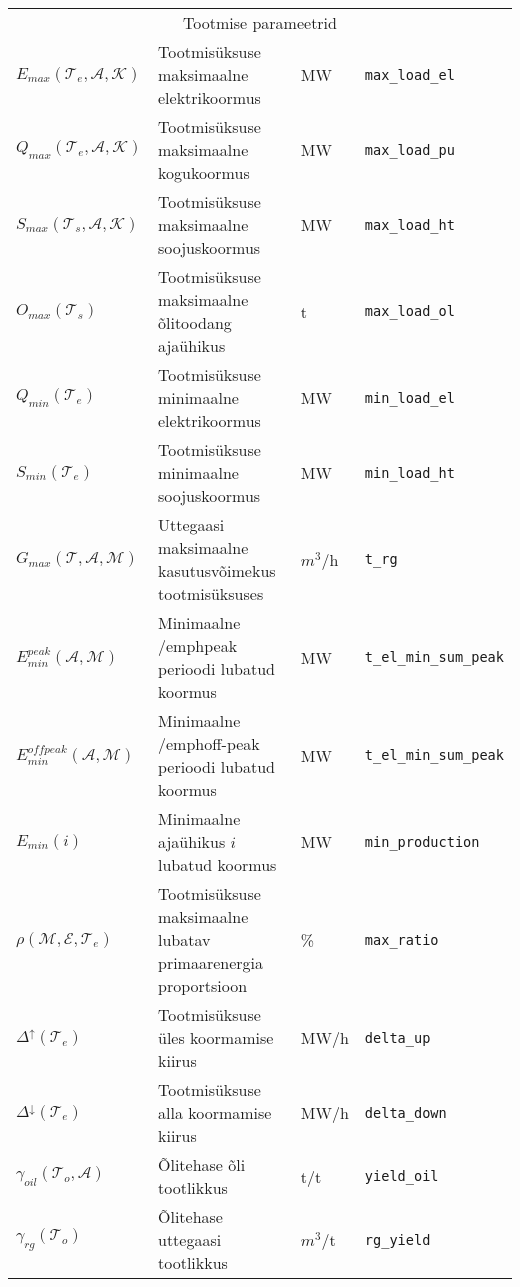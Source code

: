 \begin{landscape}
\begin{longtable}{l l l l}
\\ \multicolumn{4}{c}{Tootmise parameetrid} \\
$\mathit{E}_{max}(\mathcal{T}_e, \mathcal{A},\mathcal{K})$ & Tootmisüksuse maksimaalne elektrikoormus & MW & \texttt{max\_load\_el} \\
$\mathit{Q}_{max}(\mathcal{T}_e, \mathcal{A},\mathcal{K})$ & Tootmisüksuse maksimaalne kogukoormus & MW  & \texttt{max\_load\_pu} \\
$\mathit{S}_{max}(\mathcal{T}_s, \mathcal{A},\mathcal{K})$ & Tootmisüksuse maksimaalne soojuskoormus & MW & \texttt{max\_load\_ht}\\
$\mathit{O}_{max}(\mathcal{T}_s)$ & Tootmisüksuse maksimaalne õlitoodang ajaühikus & t & \texttt{max\_load\_ol} \\
$\mathit{Q}_{min}(\mathcal{T}_e)$ & Tootmisüksuse minimaalne elektrikoormus & MW & \texttt{min\_load\_el}\\
$\mathit{S}_{min}(\mathcal{T}_e)$ & Tootmisüksuse minimaalne soojuskoormus & MW & \texttt{min\_load\_ht}\\
$\mathit{G}_{max}(\mathcal{T}, \mathcal{A}, \mathcal{M})$&Uttegaasi maksimaalne kasutusvõimekus tootmisüksuses& $m^3$/h&\texttt{t\_rg}\\
$\mathit{E}_{min}^{peak}(\mathcal{A}, \mathcal{M})$& Minimaalne /emph{peak} perioodi lubatud koormus & MW & \texttt{t\_el\_min\_sum\_peak} \\
$\mathit{E}_{min}^{offpeak}(\mathcal{A}, \mathcal{M})$&Minimaalne /emph{off-peak} perioodi lubatud koormus & MW & \texttt{t\_el\_min\_sum\_peak} \\
$\mathit{E}_{min}(i)$&Minimaalne ajaühikus  $i$ lubatud koormus & MW & \texttt{min\_production} \\
$\mathit{\rho}(\mathcal{M}, \mathcal{E}, \mathcal{T}_e)$ & Tootmisüksuse maksimaalne lubatav primaarenergia proportsioon & \% & \texttt{max\_ratio} \\

$\mathit{\Delta^{\uparrow}}(\mathcal{T}_e)$ & Tootmisüksuse üles koormamise kiirus & MW/h & \texttt{delta\_up} \\
$\mathit{\Delta^{\downarrow}}(\mathcal{T}_e)$ & Tootmisüksuse alla koormamise kiirus & MW/h & \texttt{delta\_down} \\

$\mathit{\gamma}_{oil}(\mathcal{T}_o, \mathcal{A})$ & Õlitehase õli tootlikkus & t/t & \texttt{yield\_oil} \\
$\mathit{\gamma}_{rg}(\mathcal{T}_o)$ & Õlitehase uttegaasi tootlikkus & $m^3$/t & \texttt{rg\_yield} \\


\end{longtable}
\end{landscape}
